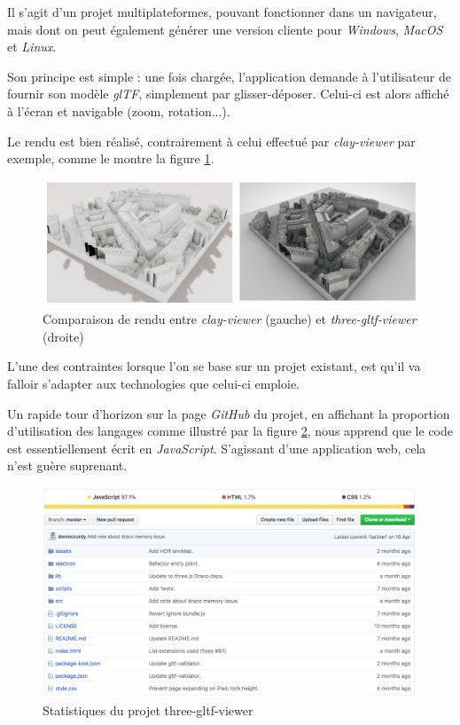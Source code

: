 Il s'agit d'un projet multiplateformes, pouvant fonctionner dans un navigateur, mais dont on peut également générer une version cliente pour \textit{Windows}, \textit{MacOS} et \textit{Linux}.

Son principe est simple : une fois chargée, l'application demande à l'utilisateur de fournir son modèle \textit{glTF}, simplement par glisser-déposer. Celui-ci est alors affiché à l'écran et navigable (zoom, rotation...).

Le rendu est bien réalisé, contrairement à celui effectué par \textit{clay-viewer} par exemple, comme le montre la figure \ref{fig:clay-viewer-vs-three-gltf-viewer}. 

\begin{figure}[h]
    \centering
    \includegraphics[width=\linewidth]{Figures/clay-viewer-vs-three-gltf-viewer.png}
    \caption{Comparaison de rendu entre \textit{clay-viewer} (gauche) et \textit{three-gltf-viewer} (droite)}
    \label{fig:clay-viewer-vs-three-gltf-viewer}
\end{figure}

L'une des contraintes lorsque l'on se base sur un projet existant, est qu'il va falloir s'adapter aux technologies que celui-ci emploie.

Un rapide tour d'horizon sur la page \textit{GitHub} du projet, en affichant la proportion d'utilisation des langages comme illustré par la figure \ref{fig:three-gltf-viewer-github-preview}, nous apprend que le code est essentiellement écrit en \textit{JavaScript}. S'agissant d'une application web, cela n'est guère suprenant.

\begin{figure}[h]
    \centering
    \includegraphics[width=\linewidth]{Figures/three-gltf-viewer-github-preview.png}
    \caption{Statistiques du projet three-gltf-viewer}
    \label{fig:three-gltf-viewer-github-preview}
\end{figure}

